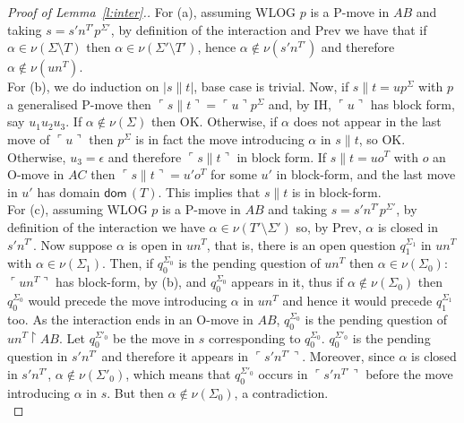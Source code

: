 \documentclass{CSML}
\theoremstyle{definition}\newtheorem{definition}[thm]{Definition}
\theoremstyle{definition}\newtheorem{example}[thm]{Example}
\theoremstyle{definition}\newtheorem{proposition}[thm]{Proposition}
\theoremstyle{definition}\newtheorem{lemma}[thm]{Lemma}
\theoremstyle{definition}\newtheorem{theorem}[thm]{Theorem}
\theoremstyle{definition}\newtheorem{corollary}[thm]{Corollary}
\theoremstyle{definition}\newtheorem{remark}[thm]{Remark}
\renewcommand\Sigma{\varSigma}
\newcommand\Tau{T}
\newcommand\rest{\upharpoonright}
\newcommand\iseq{\mathop{\|}}
\newcommand\ee\epsilon
\newcommand\remv{\setminus}
\newcommand\dom[1]{\mathsf{dom}\,#1}
\newcommand\pview[1]{\ulcorner{#1}\urcorner}
\newcommand\pv[1]{\pview{#1}}
\newcommand\na\alpha
\begin{document}
\begin{proof}[Proof of Lemma~\ref{l:inter}.]
For (a), assuming WLOG $p$ is a P-move in $AB$ and taking $s=s'n^{\Tau'}p^{\Sigma'}$, by definition of the interaction and Prev we have that if $\na\in\nu(\Sigma\remv\Tau)$ then $\na\in\nu(\Sigma'\remv\Tau')$, hence $\na\notin\nu(s'n^{\Tau'})$ and therefore $\na\notin\nu(un^\Tau)$.
\\
For (b), we do induction on $|s\iseq t|$, base case is trivial. Now, if $s\iseq t=u p^\Sigma$ with $p$ a generalised P-move then $\pv{s\iseq t}=\pv{u}p^\Sigma$ and, by IH, $\pv{u}$ has block form, say $u_1u_2u_3$. If $\na\notin\nu(\Sigma)$ then OK. Otherwise, if $\na$ does not appear in the last move of $\pv{u}$ then $p^\Sigma$ is in fact the move introducing $\na$ in $s\iseq t$, so OK. Otherwise, $u_3=\ee$ and therefore $\pv{s\iseq t}$ in block form. If $s\iseq t=u o^\Tau$ with $o$ an O-move in $AC$ then $\pv{s\iseq t}=u'o^\Tau$ for some $u'$ in block-form, and the last move in $u'$ has domain $\dom(\Tau)$. This implies that $s\iseq t$ is in block-form.
\\
For (c), assuming WLOG $p$ is a P-move in $AB$ and taking $s=s'n^{\Tau'}p^{\Sigma'}$, by definition of the interaction we have $\na\in\nu(\Tau'\remv\Sigma')$ so, by Prev, $\na$ is closed in $s'n^{\Tau'}$. Now suppose $\na$ is open in $un^{\Tau}$, that is, there is an open question $q_1^{\Sigma_1}$ in $un^{\Tau}$ with $\na\in\nu(\Sigma_1)$. Then, if $q_0^{\Sigma_0}$ is the pending question of $un^{\Tau}$ then $\na\in\nu(\Sigma_0)$: $\pv{un^{\Tau}}$ has block-form, by (b), and $q_0^{\Sigma_0}$ appears in it, thus if $\na\notin\nu(\Sigma_0)$ then $q_0^{\Sigma_0}$ would precede the move introducing $\na$ in $un^{\Tau}$ and hence it would precede $q_1^{\Sigma_1}$ too. As the interaction ends in an O-move in $AB$, $q_0^{\Sigma_0}$ is the pending question of $un^\Tau\rest AB$. Let $q_0^{\Sigma'_0}$ be the move in $s$ corresponding to $q_0^{\Sigma_0}$. $q_0^{\Sigma'_0}$ is the pending question in $s'n^{\Tau'}$ and therefore it appears in $\pv{s'n^{\Tau'}}$. Moreover, since $\na$ is closed in $s'n^{\Tau'}$, $\na\notin\nu(\Sigma'_0)$, which means that $q_0^{\Sigma'_0}$ occurs in $\pv{s'n^{\Tau'}}$ before the move introducing $\na$ in $s$. But then $\na\notin\nu(\Sigma_0)$, a contradiction.
\\

\end{proof}
\end{document}
